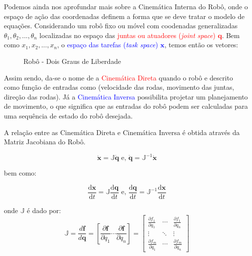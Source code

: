 Podemos ainda nos aprofundar mais sobre a Cinemática Interna do Robô, onde o espaço de ação das coordenadas definem a forma que se deve tratar o modelo de equações.
Considerando um robô fixo ou móvel com coodenadas generalizadas $\theta_1, \theta_2,..., \theta_n$ localizadas no espaço das \textcolor{red}{juntas ou atuadores (\textit{joint space}) $\mathbf{q}$}. Bem como $x_1, x_2,..., x_n$, o \textcolor{blue}{espaço das tarefas (\textit{task space}) $\mathbf{x}$}, temos então os vetores:

\begin{figure}[!ht]

\caption{Robô - Dois Graus de Liberdade}
\label{fig:2dof-robot}
\end{figure}

Assim sendo, da-se o nome de a \textcolor{red}{Cinemática Direta} quando o robô e descrito como função de entradas como (velocidade das rodas, movimento das juntas, direção das rodas).  Já a \textcolor{blue}{Cinemática Inversa} possibilita projetar um planejamento de movimento, o que significa que as entradas do robô podem ser calculadas para uma sequência de estado do robô desejada.

A relação entre as Cinemática Direta e Cinemática Inversa é obtida através da Matriz Jacobiana do Robô.

\begin{equation*}
    \mathbf{\dot{x}} = \mathbb{J}{\mathbf{\dot{q}}}
    \text{ e, }
    \mathbf{\dot{q}} = \mathbb{J}^{-1}{\mathbf{\dot{x}}}
\end{equation*}

bem como:

\begin{equation*}
    \frac{\text{d}\mathbf{x}}{\text{d}t} = \mathbb{J}\frac{\text{d}\mathbf{q}}{\text{d}t}
    \text{ e, }
    \frac{\text{d}\mathbf{q}}{\text{d}t} = \mathbb{J}^{-1}\frac{\text{d}\mathbf{x}}{\text{d}t}
\end{equation*}

onde $\mathbb{J}$ é dado por:
\begin{equation*}
    \mathbb{J}
    =
    \frac{d \mathbf{f}}{d \mathbf{q}}
    =
    \left[ \frac{\partial \mathbf{f}}{\partial q_1}
        \cdots \frac{\partial \mathbf{f}}{\partial q_n} \right]
    =
    \begin{bmatrix}
        \frac{\partial f_1}{\partial q_1} & \cdots &
        \frac{\partial f_1}{\partial q_n}                   \\
        \vdots                            & \ddots & \vdots \\
        \frac{\partial f_m}{\partial q_1} & \cdots &
        \frac{\partial f_m}{\partial q_n}
    \end{bmatrix}
\end{equation*}

